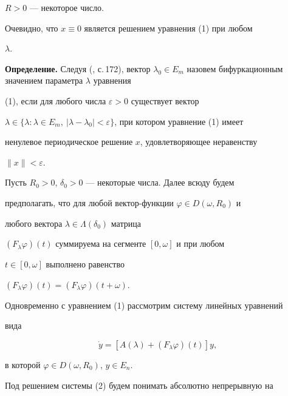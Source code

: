 $R>0$ --- некоторое число. 


 


Очевидно, что $x\equiv0$ является решением уравнения (1) при любом 


$\lambda$. 


\medskip 


 


{\bf Определение.} Следуя (\cite{1}, с.\,172), вектор $\lambda_0\in 


E_m$ назовем бифуркационным значением параметра $\lambda$ уравнения 


(1), если для любого числа $\varepsilon>0$ существует вектор 


$\lambda\in\{\lambda:\lambda\in E_m,\ 


|\lambda-\lambda_0|<\varepsilon\}$, при котором уравнение (1) имеет 


ненулевое периодическое решение $x$, удовлетворяющее неравенству 


$\|x\|<\varepsilon$. 


\medskip 


 


Пусть $R_0>0$, $\delta_0>0$ --- некоторые числа. Далее всюду будем 


предполагать, что для любой вектор-функции $\varphi\in D(\omega,R_0)$ и 


любого вектора $\lambda\in\Lambda(\delta_0)$ матрица 


$(F_\lambda\varphi)(t)$ суммируема на сегменте $[0,\omega]$ и при любом 


$t\in[0,\omega]$ выполнено равенство 


$(F_\lambda\varphi)(t)=(F_\lambda\varphi)(t+\omega)$. 


 


Одновременно с уравнением (1) рассмотрим систему линейных уравнений 


вида 


\begin{equation} 


\Dot y=[A(\lambda)+(F_\lambda\varphi)(t)]y, 


\end{equation} 


в которой $\varphi\in D(\omega,R_0)$, $y\in E_n$. 


 


Под решением системы (2) будем понимать абсолютно непрерывную на 


